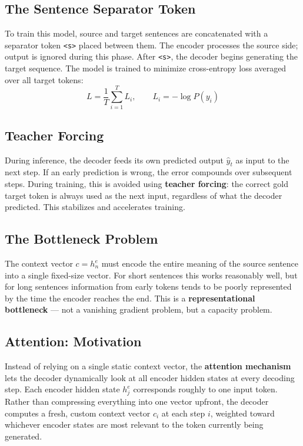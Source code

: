 \subsection{The Sentence Separator Token}

To train this model, source and target sentences are concatenated with a separator token
\texttt{<s>} placed between them. The encoder processes the source side; output is ignored
during this phase. After \texttt{<s>}, the decoder begins generating the target sequence.
The model is trained to minimize cross-entropy loss averaged over all target tokens:
\[
    L = \frac{1}{T} \sum_{i=1}^{T} L_i, \qquad L_i = -\log P(y_i)
\]

\subsection{Teacher Forcing}

During inference, the decoder feeds its own predicted output $\hat{y}_t$ as input to the
next step. If an early prediction is wrong, the error compounds over subsequent steps.
During training, this is avoided using \textbf{teacher forcing}: the correct gold target
token is always used as the next input, regardless of what the decoder predicted. This
stabilizes and accelerates training.

\subsection{The Bottleneck Problem}

The context vector $c = h_n^e$ must encode the entire meaning of the source sentence into
a single fixed-size vector. For short sentences this works reasonably well, but for long
sentences information from early tokens tends to be poorly represented by the time the
encoder reaches the end. This is a \textbf{representational bottleneck} --- not a vanishing
gradient problem, but a capacity problem.

\subsection{Attention: Motivation}

Instead of relying on a single static context vector, the \textbf{attention mechanism}
lets the decoder dynamically look at all encoder hidden states at every decoding step.
Each encoder hidden state $h_j^e$ corresponds roughly to one input token. Rather than
compressing everything into one vector upfront, the decoder computes a fresh, custom
context vector $c_i$ at each step $i$, weighted toward whichever encoder states are most
relevant to the token currently being generated.

